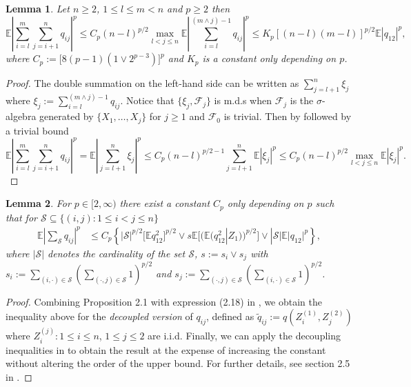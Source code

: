 \documentclass[11pt]{article}
\newtheorem{lem}{Lemma}
\numberwithin{equation}{section}
\theoremstyle{definition}
\newcommand{\E}{\mathbb{E}}
\def\m{\mathcal}
\begin{document}
\begin{lem}\label{L:Q_moment} Let $n\geq 2$, $1\leq l\leq m< n$ and $p\geq 2$ then
\[
\E\left|\sum_{i=l}^{m}\sum_{j=i+1}^{n}q_{ij}\right|^p\leq C_p (n-l)^{p/2}\max_{l<j\leq n}\E\left|\sum_{i=l}^{(m\land j)-1}q_{ij}\right|^p\leq  K_p\left[(n-l)(m-l)\right]^{p/2}\E|q_{12}|^p,
\]
where $C_p:=\big[8(p-1)(1\lor 2^{p-3})\big]^p$ and $K_p$ is a constant only depending on $p$.
\end{lem}
\begin{proof}
    The double summation on the left-hand side can be written as $\sum_{j=l+1}^{n}\xi_j$ where $\xi_{j}:=\sum_{i=l}^{(m\land j)-1}q_{ij}$. Notice that $\{\xi_j,\m{F}_j\}$ is m.d.s when $\m{F}_j$ is the $\sigma$-algebra generated by $\{X_1,\dots, X_j\}$ for $j\geq 1$ and $\m{F}_0$ is trivial.  Then by \citet{DFJ_1968} followed by a trivial bound
    \[\E\left|\sum_{i=l}^{m}\sum_{j=i+1}^{n}q_{ij}\right|^p =\E\left|\sum_{j=l+1}^{n}\xi_j\right|^p \leq C_p(n-l)^{p/2-1}\sum_{j=l+1}^{n}\E|\xi_j|^p\leq C_p (n-l)^{p/2}\max_{l<j\leq n}\E\left|\xi_j\right|^p.
    \]
\end{proof}

\begin{lem}\label{L:Q_Lp} For $p\in[2,\infty)$ there exist a constant $C_p$ only depending on $p$ such that for $\m{S}\subseteq \{(i,j): 1\leq i<j\leq n\}$
\begin{align*}
\E\left|\sum_{\m{S}} q_{ij}\right|^p&\leq C_{p}\left\{|\m{S}|^{p/2}\big[\E q_{12}^2 \big]^{p/2} \lor s\E\big[(\E (q_{12}^2|Z_1))^{p/2}\big] \lor   |\m{S}|\E|q_{12}|^p\right\},
\end{align*}
where $|\m{S}|$ denotes the cardinality of the set $\m{S}$, $s:=s_i\lor s_j$ with $s_i := \sum_{(i,\cdot)\in\m{S}}\left(\sum_{(\cdot,j)\in \m{S}} 1\right)^{p/2}$ and $s_j := \sum_{(\cdot,j)\in\m{S}}\left(\sum_{(i,\cdot)\in \m{S}} 1\right)^{p/2}$.
\end{lem}
\begin{proof}
    Combining Proposition 2.1 with expression (2.18) in \citet{gine-latala-zinn_2000}, we obtain the inequality above for the \emph{decoupled version} of $q_{ij}$, defined as $\widetilde{q}_{ij}:=q(Z_i^{(1)},Z_j^{(2)})$ where $Z_i^{(j)}:1\leq i\leq  n$, $1\leq j\leq 2$ are i.i.d. Finally, we can apply the decoupling inequalities in \citet{de1995decoupling} to obtain the result at the expense of increasing the constant without altering the order of the upper bound. For further details, see section 2.5 in \citet{gine-latala-zinn_2000}.
\end{proof}
\end{document}
